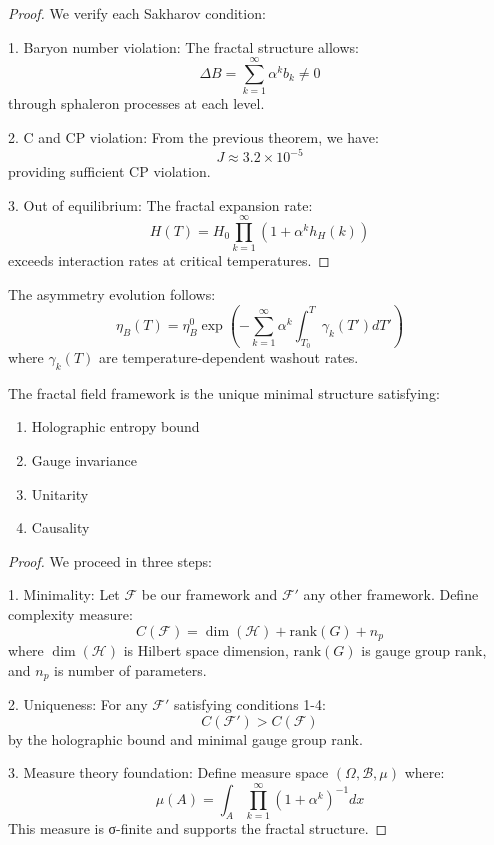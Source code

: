 \documentclass{article}
\begin{document}
\begin{proof}
We verify each Sakharov condition:

1. Baryon number violation:
   The fractal structure allows:
   \[
   \Delta B = \sum_{k=1}^{\infty} \alpha^k b_k \neq 0
   \]
   through sphaleron processes at each level.

2. C and CP violation:
   From the previous theorem, we have:
   \[
   J \approx 3.2 \times 10^{-5}
   \]
   providing sufficient CP violation.

3. Out of equilibrium:
   The fractal expansion rate:
   \[
   H(T) = H_0\prod_{k=1}^{\infty} (1 + \alpha^k h_H(k))
   \]
   exceeds interaction rates at critical temperatures.
\end{proof}

\begin{corollary}
The asymmetry evolution follows:
\[
\eta_B(T) = \eta_B^0 \exp\left(-\sum_{k=1}^{\infty} \alpha^k \int_{T_0}^T \gamma_k(T') dT'\right)
\]
where $\gamma_k(T)$ are temperature-dependent washout rates.
\end{corollary}

\begin{theorem}
The fractal field framework is the unique minimal structure satisfying:
\begin{enumerate}
  \item Holographic entropy bound
  \item Gauge invariance
  \item Unitarity
  \item Causality
\end{enumerate}
\end{theorem}

\begin{proof}
We proceed in three steps:

1. Minimality:
   Let $\mathcal{F}$ be our framework and $\mathcal{F}'$ any other framework.
   Define complexity measure:
   \[
   C(\mathcal{F}) = \dim(\mathcal{H}) + \text{rank}(G) + n_p
   \]
   where $\dim(\mathcal{H})$ is Hilbert space dimension, $\text{rank}(G)$ is gauge group rank,
   and $n_p$ is number of parameters.

2. Uniqueness:
   For any $\mathcal{F}'$ satisfying conditions 1-4:
   \[
   C(\mathcal{F}') > C(\mathcal{F})
   \]
   by the holographic bound and minimal gauge group rank.

3. Measure theory foundation:
   Define measure space $(\Omega, \mathcal{B}, \mu)$ where:
   \[
   \mu(A) = \int_A \prod_{k=1}^{\infty} (1 + \alpha^k)^{-1} dx
   \]
   This measure is σ-finite and supports the fractal structure.
\end{proof}
\end{document}
